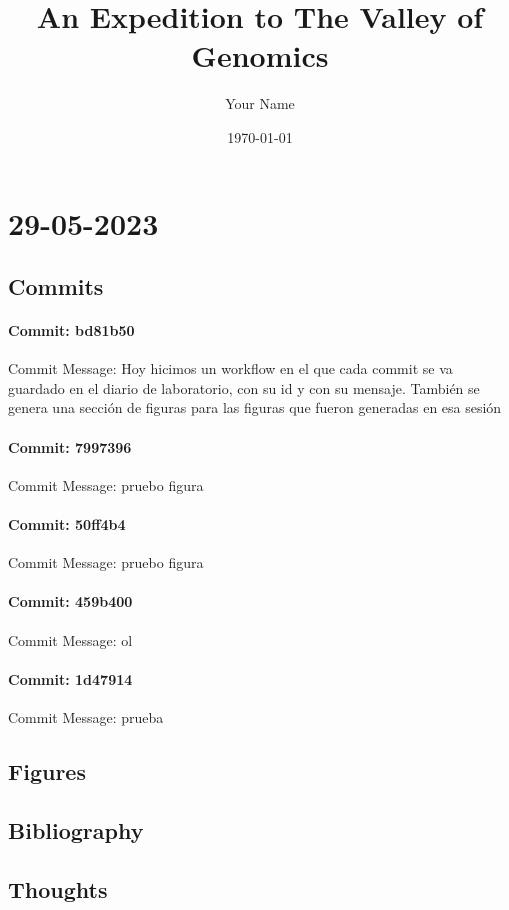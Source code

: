 \documentclass{article}
\begin{document}
\title{An Expedition to The Valley of Genomics}
\author{Your Name}
\date{\today}

\maketitle



\section{29-05-2023}
\subsection{Commits}
\paragraph{Commit: bd81b50}
Commit Message: Hoy hicimos un workflow en el que cada commit se va guardado en el diario de laboratorio, con su id y con su mensaje. También se genera una sección de figuras para las figuras que fueron generadas en esa sesión

\paragraph{Commit: 7997396}
Commit Message: pruebo figura

\paragraph{Commit: 50ff4b4}
Commit Message: pruebo figura

\paragraph{Commit: 459b400}
Commit Message: ol

\paragraph{Commit: 1d47914}
Commit Message: prueba

\subsection{Figures}
\subsection{Bibliography}
\subsection{Thoughts}
\end{document}
